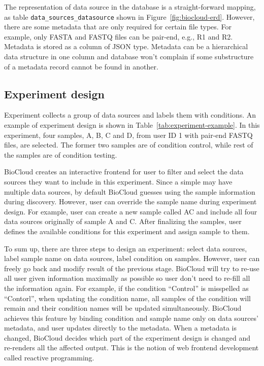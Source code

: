 The representation of data source in the database is a straight-forward
mapping, as table \texttt{data\_sources\_datasource} shown in
Figure~\ref{fig:biocloud-erd}. However, there are some metadata that are only
required for certain file types. For example, only FASTA and FASTQ files can be
pair-end, e.g., R1 and R2. Metadata is stored as a column of JSON type.
Metadata can be a hierarchical data structure in one column and database won't
complain if some substructure of a metadata record cannot be found in another.


\subsection{Experiment design}

Experiment collects a group of data sources and labels them with conditions. An
example of experiment design is shown in Table~\ref{tab:experiment-example}. In
this experiment, four samples, A, B, C and D, from user ID 1 with pair-end
FASTQ files, are selected. The former two samples are of condition control,
while rest of the samples are of condition testing.



BioCloud creates an interactive frontend for user to filter and select the data
sources they want to include in this experiment. Since a simple may have
multiple data sources, by default BioCloud guesses using the sample information
during discovery. However, user can override the sample name during experiment
design. For example, user can create a new sample called AC and include all
four data sources originally of sample A and C. After finalizing the samples,
user defines the available conditions for this experiment and assign sample to
them.

To sum up, there are three steps to design an experiment: select data sources,
label sample name on data sources, label condition on samples. However, user
can freely go back and modify result of the previous stage. BioCloud will try
to re-use all user given information maximally as possible so user don't need
to re-fill all the information again. For example, if the condition ``Control''
is misspelled as ``Contorl'', when updating the condition name, all samples of
the condition will remain and their condition names will be updated
simultaneously. BioCloud achieves this feature by binding condition and sample
name only on data sources' metadata, and user updates directly to the metadata.
When a metadata is changed, BioCloud decides which part of the experiment
design is changed and re-renders all the affected output. This is the notion of
web frontend development called reactive programming.

